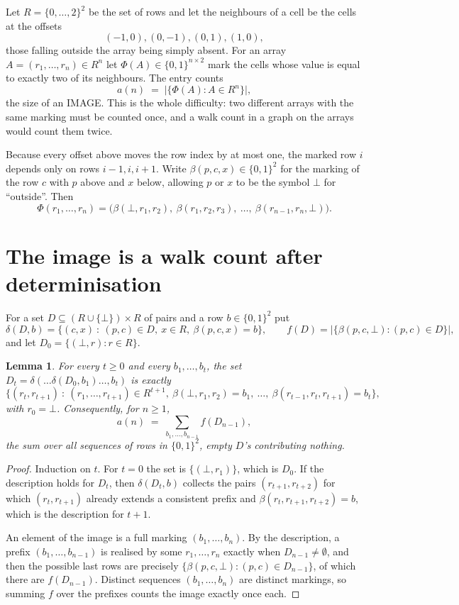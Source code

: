 \documentclass[11pt,a4paper]{article}
\theoremstyle{plain}
\newtheorem{lemma}[theorem]{Lemma}
\theoremstyle{definition}
\begin{document}
Let $R=\{0,\dots,2\}^{2}$ be the set of rows and let the neighbours of a cell be the
cells at the offsets
\[
(-1,0), (0,-1), (0,1), (1,0),
\]
those falling outside the array being simply absent. For an array
$A=(r_1,\dots,r_n)\in R^n$ let $\Phi(A)\in\{0,1\}^{n\times2}$ mark the cells whose value
is equal to exactly two of its neighbours. The entry counts
\[
a(n)\;=\;\bigl|\{\Phi(A):A\in R^n\}\bigr| ,
\]
the size of an IMAGE. This is the whole difficulty: two different arrays with the same marking
must be counted once, and a walk count in a graph on the arrays would count them twice.

Because every offset above moves the row index by at most one, the marked row $i$ depends only
on rows $i-1,i,i+1$. Write $\beta(p,c,x)\in\{0,1\}^{2}$ for the marking of the row $c$
with $p$ above and $x$ below, allowing $p$ or $x$ to be the symbol $\bot$ for ``outside''.
Then
\[
\Phi(r_1,\dots,r_n)=\bigl(\beta(\bot,r_1,r_2),\ \beta(r_1,r_2,r_3),\ \dots,\
\beta(r_{n-1},r_n,\bot)\bigr).
\]

\section{The image is a walk count after determinisation}

For a set $D\subseteq(R\cup\{\bot\})\times R$ of pairs and a row $b\in\{0,1\}^{2}$ put
\[
\delta(D,b)=\{(c,x)\ :\ (p,c)\in D,\ x\in R,\ \beta(p,c,x)=b\},\qquad
f(D)=\bigl|\{\beta(p,c,\bot):(p,c)\in D\}\bigr| ,
\]
and let $D_0=\{(\bot,r):r\in R\}$.

\begin{lemma}\label{lem:det}
For every $t\ge0$ and every $b_1,\dots,b_t$, the set
$D_t=\delta(\dots\delta(D_0,b_1)\dots,b_t)$ is exactly
\[
\{(r_t,r_{t+1})\ :\ (r_1,\dots,r_{t+1})\in R^{t+1},\ \beta(\bot,r_1,r_2)=b_1,\ \dots,\
\beta(r_{t-1},r_t,r_{t+1})=b_t\} ,
\]
with $r_0=\bot$. Consequently, for $n\ge1$,
\[
a(n)\;=\;\sum_{b_1,\dots,b_{n-1}}f(D_{n-1}),
\]
the sum over all sequences of rows in $\{0,1\}^{2}$, empty $D$'s contributing nothing.
\end{lemma}

\begin{proof}
Induction on $t$. For $t=0$ the set is $\{(\bot,r_1)\}$, which is $D_0$. If the description
holds for $D_t$, then $\delta(D_t,b)$ collects the pairs $(r_{t+1},r_{t+2})$ for which
$(r_t,r_{t+1})$ already extends a consistent prefix and
$\beta(r_t,r_{t+1},r_{t+2})=b$, which is the description for $t+1$.

An element of the image is a full marking $(b_1,\dots,b_n)$. By the description, a prefix
$(b_1,\dots,b_{n-1})$ is realised by some $r_1,\dots,r_n$ exactly when $D_{n-1}\neq
\emptyset$, and then the possible last rows are precisely
$\{\beta(p,c,\bot):(p,c)\in D_{n-1}\}$, of which there are $f(D_{n-1})$. Distinct
sequences $(b_1,\dots,b_n)$ are distinct markings, so summing $f$ over the prefixes counts the
image exactly once each.
\end{proof}
\end{document}

